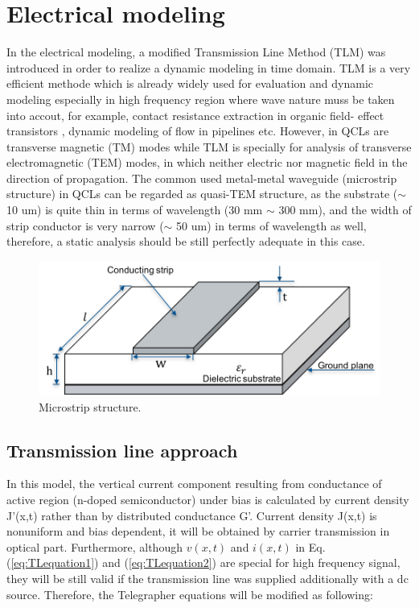 \documentclass[11pt,final]{scrbook}
\begin{document}
\section{Electrical modeling}
In the electrical modeling, a modified Transmission Line Method (TLM) was introduced in order to realize a dynamic modeling in time domain. TLM is a very efficient methode which is already widely used for evaluation and dynamic modeling especially in high frequency region where wave nature muss be taken into accout, for example, contact resistance extraction in organic field- effect transistors \cite{xu2010modified}, dynamic modeling of flow in pipelines \cite{johnston2014enhanced} etc. However, in QCLs are transverse magnetic (TM) modes \cite{yan2009directional} while TLM is specially for analysis of transverse electromagnetic (TEM) modes, in which neither electric nor magnetic field in the direction of propagation. The common used metal-metal waveguide (microstrip structure) in QCLs can be regarded as quasi-TEM structure, as the substrate ($ \sim $ 10 um) is quite thin in terms of wavelength (30 mm $ \sim $ 300 mm), and the width of strip conductor is very narrow ($ \sim $ 50 um) in terms of wavelength as well, therefore, a static analysis should be still perfectly adequate in this case.

\begin{figure}[htbp]
\begin{center}
\includegraphics[scale=0.8]{images/Microstrip.pdf}
\caption{Microstrip structure.}
\label{fig:Microstrip}
\end{center}
\end{figure}

\subsection{Transmission line approach}
In this model, the vertical current component resulting from conductance of active region (n-doped semiconductor) under bias is calculated by current density J'(x,t) rather than by distributed conductance G'. Current density J(x,t) is nonuniform and bias dependent, it will be obtained by carrier transmission in optical part. Furthermore, although $v(x,t)$ and $i(x,t)$ in Eq. (\ref{eq:TLequation1}) and (\ref{eq:TLequation2}) are special for high frequency signal, they will be still valid if the transmission line was supplied additionally with a dc source. Therefore, the Telegrapher equations will be modified as following:
\end{document}
